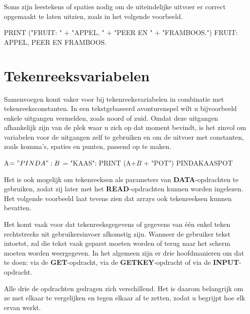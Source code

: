 Soms zijn leestekens of spaties nodig om de uiteindelijke uitvoer er correct opgemaakt te laten uitzien, zoals in het volgende voorbeeld.

\begin{screencode}
PRINT ("FRUIT: " + "APPEL, " + "PEER EN " + "FRAMBOOS.")
FRUIT: APPEL, PEER EN FRAMBOOS.
\end{screencode}

\section{Tekenreeksvariabelen}

Samenvoegen komt vaker voor bij tekenreeksvariabelen in combinatie met tekenreeksconstanten. In een tekstgebaseerd avonturenspel wilt u bijvoorbeeld enkele uitgangen vermelden, zoals noord of zuid. Omdat deze uitgangen afhankelijk zijn van de plek waar u zich op dat moment bevindt, is het zinvol om variabelen voor de uitgangen zelf te gebruiken en om de uitvoer met constanten, zoals komma's, spaties en punten, passend op te maken.

\begin{screencode}
A$ = "PINDA": B$ = "KAAS": PRINT (A$ + B$ + "POT")
PINDAKAASPOT
\end{screencode}

Het is ook mogelijk om tekenreeksen als parameters van {\bf DATA}-opdrachten te gebruiken, zodat zij later met het {\bf READ}-opdrachten kunnen worden ingelezen. Het volgende voorbeeld laat tevens zien dat arrays ook tekenreeksen kunnen bevatten.


Het komt vaak voor dat tekenreeksgegevens of gegevens van één enkel teken rechtstreeks uit gebruikersinvoer afkomstig zijn. Wanneer de gebruiker tekst intoetst, zal die tekst vaak geparst moeten worden of terug naar het scherm moeten worden weergegeven. In het algemeen zijn er drie hoofdmanieren om dat te doen: via de {\bf GET}-opdracht, via de {\bf GETKEY}-opdracht of via de {\bf INPUT}-opdracht.

Alle drie de opdrachten gedragen zich verschillend. Het is daarom belangrijk om ze met elkaar te vergelijken en tegen elkaar af te zetten, zodat u begrijpt hoe elk ervan werkt.

